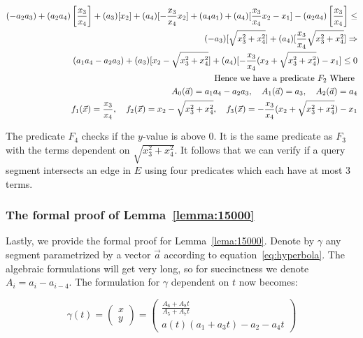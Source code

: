 \documentclass[UKenglish]{lipics-v2019}
\begin{document}
\begin{align*}
    (- a_2 a_3) +  (a_2 a_4) \left[\frac{x_3}{x_4}\right] +  (a_3)[x_2] + (a_4)[ - \frac{x_3}{x_4}x_2] + (a_4 a_1) + (a_4)[ \frac{x_3}{x_4}x_2 - x_1] - (a_2a_4)\left[\frac{x_3}{x_4}\right]
        \le \\
    (- a_3)[ \sqrt{x_3^2 + x_4^2} ] + (a_4) [\frac{x_3}{x_4} \sqrt{x_3^2 + x_4^2}] \Rightarrow \\
    (a_1 a_4 - a_2 a_3) + (a_3)[x_2 - \sqrt{x_3^2 + x_4^2}] + (a_4)[ - \frac{x_3}{x_4}( x_2 + \sqrt{x_3^2 + x_4^2}) -x_1 ] \le 0 \\
    \textnormal{Hence we have a predicate } F_2 \textnormal{ Where } \\
    A_0(\vec{a}) = a_1 a_4 - a_2 a_3, \quad A_1(\vec{a}) = a_3, \quad A_2(\vec{a}) = a_4 \\
   f_1(\vec{x}) = \frac{x_3}{x_4}, \quad f_2(\vec{x}) =  x_2 - \sqrt{x_3^2 + x_4^2}, \quad f_3(\vec{x}) = - \frac{x_3}{x_4}( x_2 + \sqrt{x_3^2 + x_4^2}) -x_1
\end{align*}

The predicate $F_4$ checks if the $y$-value is above $0$. It is the same predicate as $F_3$ with the terms dependent on $\sqrt{x_3^2 + x_4^2}$. It follows that we can verify if a query segment intersects an edge in $E$ using four predicates which each have at most 3 terms. 

\subsubsection{The formal proof of Lemma~\ref{lemma:15000}}

Lastly, we provide the formal proof for Lemma~\ref{lema:15000}. Denote by $\gamma$ any segment parametrized by a vector $\vec{a}$ according to equation~\ref{eq:hyperbola}. The algebraic formulations will get very long, so for succinctness we denote $A_i = a_i - a_{i-4}$. The formulation for $\gamma$ dependent on $t$ now becomes:

\begin{equation}
  \gamma(t) = \left( \begin{array}{c}
         x  \\
         y 
    \end{array}  \right) =  
        \left( \begin{array}{c}
         \frac{ A_6 + A_8 t}
      { A_5  + A_7 t } \\
         a(t)(a_1 +  a_3 t) - a_2 -  a_4 t 
    \end{array}  \right)
\end{equation}
\end{document}
